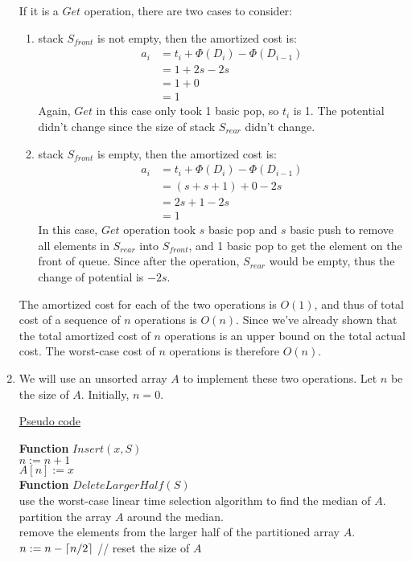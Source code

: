 \documentclass[11pt]{article}
\DeclarePairedDelimiter\ceil{\lceil}{\rceil}
\begin{document}
\begin{enumerate}
If it is a $Get$ operation, there are two cases to consider:
\begin{enumerate}
\item stack $S_{front}$ is not empty, then the amortized cost is:
  \begin{align}
    a_i &= t_i + \Phi(D_i) - \Phi(D_{i-1})\\
    &= 1 + 2s - 2s\\
    &= 1 + 0\\
    &= 1
  \end{align}
  Again, $Get$ in this case only took 1 basic pop, so $t_i$ is 1. The
  potential didn't change since the size of stack $S_{rear}$ didn't
  change. 
\item stack $S_{front}$ is empty, then the amortized cost is:
  \begin{align}
    a_i &= t_i + \Phi(D_i) - \Phi(D_{i-1})\\
    &= (s+s+1) + 0 - 2s\\
    &= 2s + 1 - 2s\\
    &= 1
  \end{align}
  In this case, $Get$ operation took $s$ basic pop and $s$ basic push
  to remove all elements in $S_{rear}$ into $S_{front}$, and 1 basic
  pop to get the element on the front of queue. Since after the
  operation, $S_{rear}$ would be empty, thus the change of potential
  is $-2s$.
\end{enumerate}

The amortized cost for each of the two operations is $O(1)$, and thus
of total cost of a sequence of $n$ operations is $O(n)$. Since we've
already shown that the total amortized cost of $n$ operations is an
upper bound on the total actual cost. The worst-case cost of $n$
operations is therefore $O(n)$. 

\item %
  We will use an unsorted array $A$ to implement these two
  operations. Let $n$ be the size of $A$. Initially, $n=0$.

\underline{Pseudo code}

\textbf{Function} $Insert(x,S)$\\
\-\hspace{2em} $n := n + 1$\\
\-\hspace{2em} $A[n] := x$\\

\textbf{Function} $DeleteLargerHalf(S)$\\
\-\hspace{2em} use the worst-case linear time selection algorithm to
find the median of $A$.\\
\-\hspace{2em} partition the array $A$ around the median.\\
\-\hspace{2em} remove the elements from the larger half of the
partitioned array $A$.\\
\-\hspace{2em} $n := n - \ceil{n/2}$ // reset the size of $A$\\


\end{enumerate}
\end{document}
